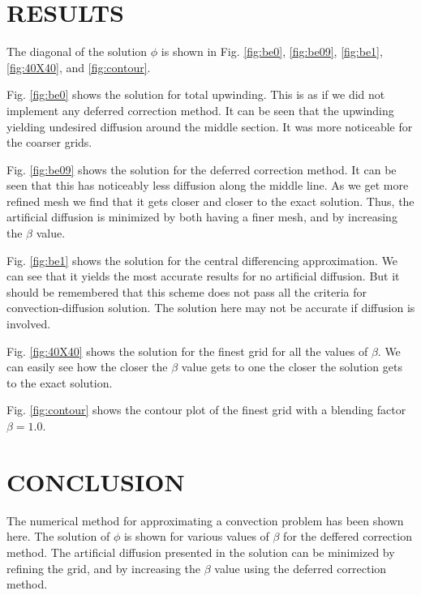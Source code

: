 \documentclass[cleanfoot,cleanhead,twocolumn,10pt,notitlepage]{asme2e}
\begin{document}
\section*{RESULTS}

The diagonal of the solution $\phi$ is shown in Fig. \ref{fig:be0}, \ref{fig:be09}, \ref{fig:be1}, \ref{fig:40X40}, and \ref{fig:contour}.  

Fig. \ref{fig:be0} shows the solution for total upwinding.  This is as if we did not implement any deferred correction method.  It can be seen that the upwinding yielding undesired diffusion around the middle section.  It was more noticeable for the coarser grids.  

Fig. \ref{fig:be09} shows the solution for the deferred correction method.  It can be seen that this has noticeably less diffusion along the middle line.  As we get more refined mesh we find that it gets closer and closer to the exact solution.  Thus, the artificial diffusion is minimized by both having a finer mesh, and by increasing the $\beta$ value.  

Fig. \ref{fig:be1} shows the solution for the central differencing approximation.  We can see that it yields the most accurate results for no artificial diffusion.  But it should be remembered that this scheme does not pass all the criteria for convection-diffusion solution.  The solution here may not be accurate if diffusion is involved.

Fig. \ref{fig:40X40} shows the solution for the finest grid for all the values of $\beta$.  We can easily see how the closer the $\beta$ value gets to one the closer the solution gets to the exact solution.  

Fig. \ref{fig:contour} shows the contour plot of the finest grid with a blending factor $\beta = 1.0$.  



\section*{CONCLUSION}

The numerical method for approximating a convection problem has been shown here.  The solution of $\phi$ is shown for various values of $\beta$ for the deffered correction method. The artificial diffusion presented in the solution can be minimized by refining the grid, and by increasing the $\beta$ value using the deferred correction method.  
\end{document}
